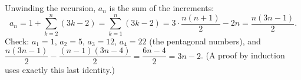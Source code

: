 Unwinding the recursion, $a_n$ is the sum of the increments:
\[
a_n=1+\sum_{k=2}^{n}(3k-2)=\sum_{k=1}^{n}(3k-2)=3\cdot\dfrac{n(n+1)}{2}-2n=\boxed{\dfrac{n(3n-1)}{2}}.
\]
Check: $a_1=1$, $a_2=5$, $a_3=12$, $a_4=22$ (the pentagonal numbers), and $\dfrac{n(3n-1)}{2}-\dfrac{(n-1)(3n-4)}{2}=\dfrac{6n-4}{2}=3n-2$. (A proof by induction uses exactly this last identity.)
